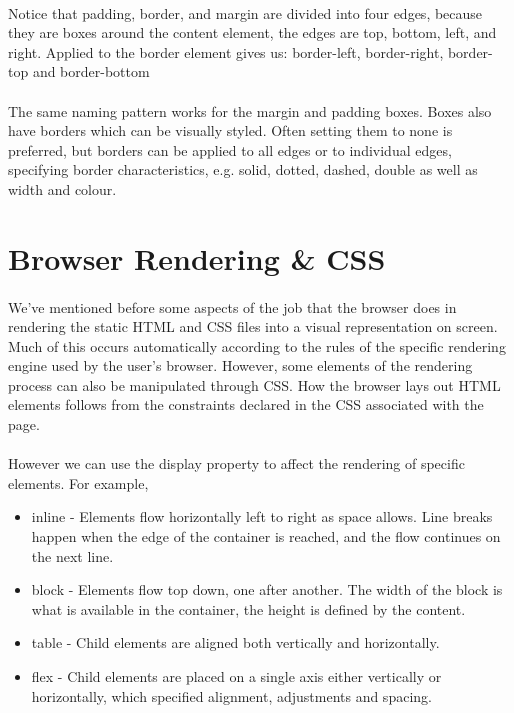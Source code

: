 \paragraph{} Notice that padding, border, and margin are divided into four edges, because they are boxes around the content element, the edges are top, bottom, left, and right. Applied to the border element gives us:
	border-left, border-right, border-top and border-bottom 

\paragraph{} The same naming pattern works for the margin and padding boxes. Boxes also have borders which can be visually styled. Often setting them to none is preferred, but borders can be applied to all edges or to individual edges, specifying border characteristics, e.g. {solid, dotted, dashed, double} as well as width and colour.



\section{Browser Rendering \& CSS}
\paragraph{} We've mentioned before some aspects of the job that the browser does in rendering the static HTML and CSS files into a visual representation on screen. Much of this occurs automatically according to the rules of the specific rendering engine used by the user's browser. However, some elements of the rendering process can also be manipulated through CSS. How the browser lays out HTML elements follows from the constraints declared in the CSS associated with the page. 
\paragraph{} However we can use the display property to affect the rendering of specific elements. For example, 

\begin{itemize}
	\item inline - Elements flow horizontally left to right as space allows. Line breaks happen when the edge of the container is reached, and the flow continues on the next line.
	\item block - Elements flow top down, one after another. The width of the block is what is available in the container, the height is defined by the content.
	\item table - Child elements are aligned both vertically and horizontally.
	\item flex - Child elements are placed on a single axis either vertically or horizontally, which specified alignment, adjustments and spacing.
\end{itemize}

